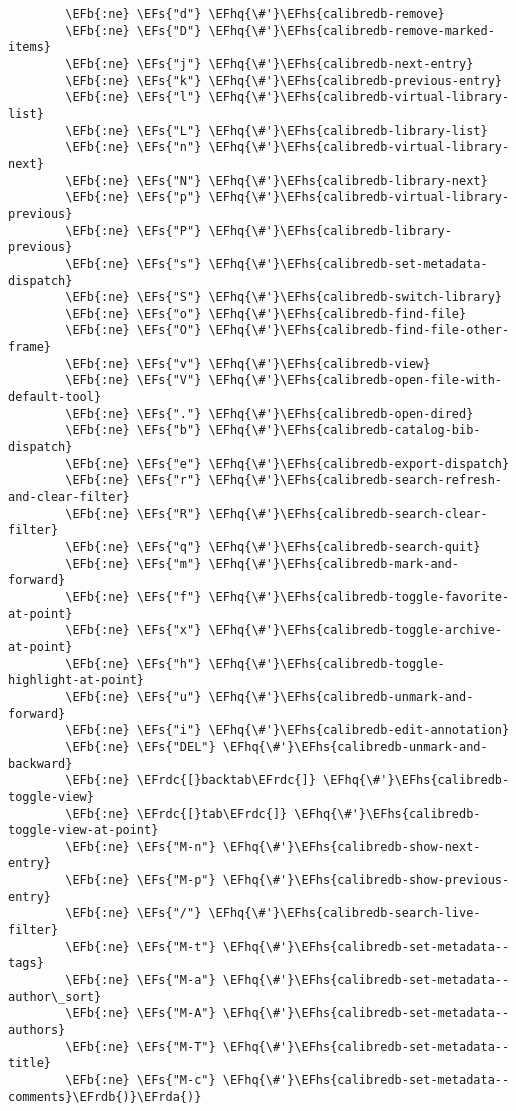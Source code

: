 \documentclass[a4wide,10pt]{article}
\newcommand{\EFs}[1]{\textcolor{EFs}{#1}} %
\newcommand{\EFb}[1]{\textcolor{EFb}{#1}} %
\newcommand{\EFhq}[1]{\textcolor{EFhq}{#1}} %
\newcommand{\EFhs}[1]{\textcolor{EFhs}{#1}} %
\newcommand{\EFrda}[1]{\textcolor{EFrda}{#1}} %
\newcommand{\EFrdb}[1]{\textcolor{EFrdb}{#1}} %
\newcommand{\EFrdc}[1]{\textcolor{EFrdc}{#1}} %
\begin{document}
\begin{Code}
\begin{Verbatim}
        \EFb{:ne} \EFs{"d"} \EFhq{\#'}\EFhs{calibredb-remove}
        \EFb{:ne} \EFs{"D"} \EFhq{\#'}\EFhs{calibredb-remove-marked-items}
        \EFb{:ne} \EFs{"j"} \EFhq{\#'}\EFhs{calibredb-next-entry}
        \EFb{:ne} \EFs{"k"} \EFhq{\#'}\EFhs{calibredb-previous-entry}
        \EFb{:ne} \EFs{"l"} \EFhq{\#'}\EFhs{calibredb-virtual-library-list}
        \EFb{:ne} \EFs{"L"} \EFhq{\#'}\EFhs{calibredb-library-list}
        \EFb{:ne} \EFs{"n"} \EFhq{\#'}\EFhs{calibredb-virtual-library-next}
        \EFb{:ne} \EFs{"N"} \EFhq{\#'}\EFhs{calibredb-library-next}
        \EFb{:ne} \EFs{"p"} \EFhq{\#'}\EFhs{calibredb-virtual-library-previous}
        \EFb{:ne} \EFs{"P"} \EFhq{\#'}\EFhs{calibredb-library-previous}
        \EFb{:ne} \EFs{"s"} \EFhq{\#'}\EFhs{calibredb-set-metadata-dispatch}
        \EFb{:ne} \EFs{"S"} \EFhq{\#'}\EFhs{calibredb-switch-library}
        \EFb{:ne} \EFs{"o"} \EFhq{\#'}\EFhs{calibredb-find-file}
        \EFb{:ne} \EFs{"O"} \EFhq{\#'}\EFhs{calibredb-find-file-other-frame}
        \EFb{:ne} \EFs{"v"} \EFhq{\#'}\EFhs{calibredb-view}
        \EFb{:ne} \EFs{"V"} \EFhq{\#'}\EFhs{calibredb-open-file-with-default-tool}
        \EFb{:ne} \EFs{"."} \EFhq{\#'}\EFhs{calibredb-open-dired}
        \EFb{:ne} \EFs{"b"} \EFhq{\#'}\EFhs{calibredb-catalog-bib-dispatch}
        \EFb{:ne} \EFs{"e"} \EFhq{\#'}\EFhs{calibredb-export-dispatch}
        \EFb{:ne} \EFs{"r"} \EFhq{\#'}\EFhs{calibredb-search-refresh-and-clear-filter}
        \EFb{:ne} \EFs{"R"} \EFhq{\#'}\EFhs{calibredb-search-clear-filter}
        \EFb{:ne} \EFs{"q"} \EFhq{\#'}\EFhs{calibredb-search-quit}
        \EFb{:ne} \EFs{"m"} \EFhq{\#'}\EFhs{calibredb-mark-and-forward}
        \EFb{:ne} \EFs{"f"} \EFhq{\#'}\EFhs{calibredb-toggle-favorite-at-point}
        \EFb{:ne} \EFs{"x"} \EFhq{\#'}\EFhs{calibredb-toggle-archive-at-point}
        \EFb{:ne} \EFs{"h"} \EFhq{\#'}\EFhs{calibredb-toggle-highlight-at-point}
        \EFb{:ne} \EFs{"u"} \EFhq{\#'}\EFhs{calibredb-unmark-and-forward}
        \EFb{:ne} \EFs{"i"} \EFhq{\#'}\EFhs{calibredb-edit-annotation}
        \EFb{:ne} \EFs{"DEL"} \EFhq{\#'}\EFhs{calibredb-unmark-and-backward}
        \EFb{:ne} \EFrdc{[}backtab\EFrdc{]} \EFhq{\#'}\EFhs{calibredb-toggle-view}
        \EFb{:ne} \EFrdc{[}tab\EFrdc{]} \EFhq{\#'}\EFhs{calibredb-toggle-view-at-point}
        \EFb{:ne} \EFs{"M-n"} \EFhq{\#'}\EFhs{calibredb-show-next-entry}
        \EFb{:ne} \EFs{"M-p"} \EFhq{\#'}\EFhs{calibredb-show-previous-entry}
        \EFb{:ne} \EFs{"/"} \EFhq{\#'}\EFhs{calibredb-search-live-filter}
        \EFb{:ne} \EFs{"M-t"} \EFhq{\#'}\EFhs{calibredb-set-metadata--tags}
        \EFb{:ne} \EFs{"M-a"} \EFhq{\#'}\EFhs{calibredb-set-metadata--author\_sort}
        \EFb{:ne} \EFs{"M-A"} \EFhq{\#'}\EFhs{calibredb-set-metadata--authors}
        \EFb{:ne} \EFs{"M-T"} \EFhq{\#'}\EFhs{calibredb-set-metadata--title}
        \EFb{:ne} \EFs{"M-c"} \EFhq{\#'}\EFhs{calibredb-set-metadata--comments}\EFrdb{)}\EFrda{)}


\end{Verbatim}
\end{Code}
\end{document}
